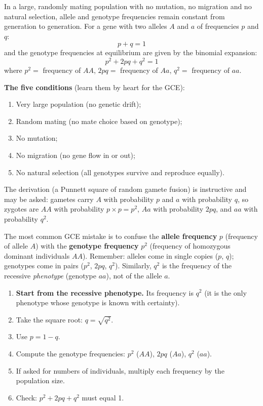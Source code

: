 \documentclass[11pt]{article}
\begin{document}
\begin{propriete}
In a large, randomly mating population with no mutation, no migration and no natural selection, allele and genotype frequencies remain constant from generation to generation. For a gene with two alleles $A$ and $a$ of frequencies $p$ and $q$:
\[
p + q = 1
\]
and the genotype frequencies at equilibrium are given by the binomial expansion:
\[
p^{2} + 2pq + q^{2} = 1
\]
where $p^{2} = $ frequency of $AA$, $2pq = $ frequency of $Aa$, $q^{2} = $ frequency of $aa$.

\textbf{The five conditions} (learn them by heart for the GCE):
\begin{enumerate}
\item Very large population (no genetic drift);
\item Random mating (no mate choice based on genotype);
\item No mutation;
\item No migration (no gene flow in or out);
\item No natural selection (all genotypes survive and reproduce equally).
\end{enumerate}
The derivation (a Punnett square of random gamete fusion) is instructive and may be asked: gametes carry $A$ with probability $p$ and $a$ with probability $q$, so zygotes are $AA$ with probability $p \times p = p^{2}$, $Aa$ with probability $2pq$, and $aa$ with probability $q^{2}$.
\end{propriete}

\begin{attention}
The most common GCE mistake is to confuse the \textbf{allele frequency} $p$ (frequency of allele $A$) with the \textbf{genotype frequency} $p^{2}$ (frequency of homozygous dominant individuals $AA$). Remember: alleles come in single copies ($p$, $q$); genotypes come in pairs ($p^{2}$, $2pq$, $q^{2}$). Similarly, $q^{2}$ is the frequency of the recessive \emph{phenotype} (genotype $aa$), not of the allele $a$.
\end{attention}

\begin{methode}
\begin{enumerate}
\item \textbf{Start from the recessive phenotype.} Its frequency is $q^{2}$ (it is the only phenotype whose genotype is known with certainty).
\item Take the square root: $q = \sqrt{q^{2}}$.
\item Use $p = 1 - q$.
\item Compute the genotype frequencies: $p^{2}$ ($AA$), $2pq$ ($Aa$), $q^{2}$ ($aa$).
\item If asked for numbers of individuals, multiply each frequency by the population size.
\item Check: $p^{2} + 2pq + q^{2}$ must equal 1.
\end{enumerate}
\end{methode}
\end{document}
